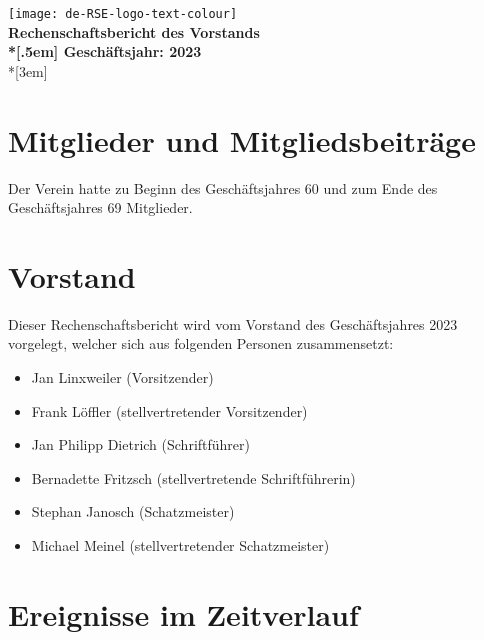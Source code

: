 \newcommand{\jahr}{2023}



\thispagestyle{empty}

\begin{centering}
\texttt{[image: de-RSE-logo-text-colour]}\\
\vspace{3em}
\textbf{
 \Large Rechenschaftsbericht des Vorstands\\*[.5em]
 \normalsize Geschäftsjahr: \jahr}\\*[3em]
\end{centering}

\section{Mitglieder und Mitgliedsbeiträge}

Der Verein hatte zu Beginn des Geschäftsjahres 60 und zum Ende des Geschäftsjahres 69 Mitglieder.

\section{Vorstand}

Dieser Rechenschaftsbericht wird vom Vorstand des Geschäftsjahres 2023 vorgelegt, welcher sich aus folgenden Personen zusammensetzt:

\begin{itemize}
  \setlength{\itemsep}{0pt plus 1pt}
  \item Jan Linxweiler (Vorsitzender)
  \item Frank Löffler (stellvertretender Vorsitzender)
  \item Jan Philipp Dietrich (Schriftführer)
  \item Bernadette Fritzsch (stellvertretende Schriftführerin)
  \item Stephan Janosch (Schatzmeister)
  \item Michael Meinel (stellvertretender Schatzmeister)
\end{itemize}

\section{Ereignisse im Zeitverlauf}

